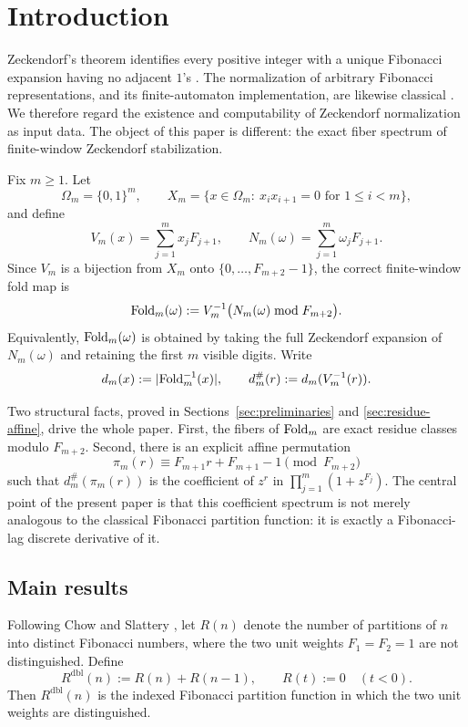 \section{Introduction}\label{sec:introduction}

Zeckendorf's theorem identifies every positive integer with a unique Fibonacci
expansion having no adjacent \(1\)'s \cite{Lekkerkerker1952,Zeckendorf1972}.
The normalization of arbitrary Fibonacci representations, and its
finite-automaton implementation, are likewise classical
\cite{Frougny1992NumbersAutomata,Frougny1999OnlineAddition,
ShallitShan2023,AhlbachUsatineFrougnyPippenger2013}.  We therefore regard the
existence and computability of Zeckendorf normalization as input data.  The
object of this paper is different: the exact fiber spectrum of finite-window
Zeckendorf stabilization.

Fix \(m\ge 1\).  Let
\[
  \Omega_m=\{0,1\}^m,
  \qquad
  X_m=\{x\in\Omega_m:\ x_ix_{i+1}=0\text{ for }1\le i<m\},
\]
and define
\[
  V_m(x)=\sum_{j=1}^m x_jF_{j+1},
  \qquad
  N_m(\omega)=\sum_{j=1}^m \omega_jF_{j+1}.
\]
Since \(V_m\) is a bijection from \(X_m\) onto \(\{0,\dots,F_{m+2}-1\}\), the
correct finite-window fold map is
\[
  \mathrm{Fold}_m(\omega):=V_m^{-1}\bigl(N_m(\omega)\bmod F_{m+2}\bigr).
\]
Equivalently, \(\mathrm{Fold}_m(\omega)\) is obtained by taking the full Zeckendorf
expansion of \(N_m(\omega)\) and retaining the first \(m\) visible digits.
Write
\[
  d_m(x):=\lvert \mathrm{Fold}_m^{-1}(x) \rvert,
  \qquad
  d_m^\#(r):=d_m(V_m^{-1}(r)).
\]

Two structural facts, proved in Sections~\ref{sec:preliminaries} and
\ref{sec:residue-affine}, drive the whole paper.  First, the fibers of
\(\mathrm{Fold}_m\) are exact residue classes modulo \(F_{m+2}\).  Second, there is an
explicit affine permutation
\[
  \pi_m(r)\equiv F_{m+1}r+F_{m+1}-1 \pmod{F_{m+2}}
\]
such that \(d_m^\#(\pi_m(r))\) is the coefficient of \(z^r\) in
\(\prod_{j=1}^m(1+z^{F_j})\).  The central point of the present paper is that
this coefficient spectrum is not merely analogous to the classical Fibonacci
partition function: it is exactly a Fibonacci-lag discrete derivative of it.

\subsection{Main results}

Following Chow and Slattery \cite{ChowSlattery2021}, let \(R(n)\) denote the
number of partitions of \(n\) into distinct Fibonacci numbers, where the two
unit weights \(F_1=F_2=1\) are not distinguished.  Define
\[
  R^{\mathrm{dbl}}(n):=R(n)+R(n-1),
  \qquad
  R(t):=0\quad (t<0).
\]
Then \(R^{\mathrm{dbl}}(n)\) is the indexed Fibonacci partition function in
which the two unit weights are distinguished.

